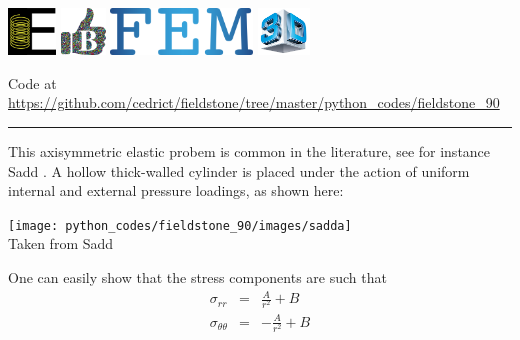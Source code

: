 \includegraphics[height=1.25cm]{images/pictograms/elasticity}
\includegraphics[height=1.25cm]{images/pictograms/benchmark}
\includegraphics[height=1.25cm]{images/pictograms/FEM}
\includegraphics[height=1.25cm]{images/pictograms/3d}




\begin{center}
Code at \url{https://github.com/cedrict/fieldstone/tree/master/python_codes/fieldstone_90}
\end{center}

\par\noindent\rule{\textwidth}{0.4pt}


This axisymmetric elastic probem is common in the literature, see for instance Sadd \cite{sadd14}.
A hollow thick-walled cylinder is placed under the
action of uniform internal and external pressure loadings, as shown here:

\begin{center}
\texttt{[image: python\_codes/fieldstone\_90/images/sadda]}\\
{\captionfont Taken from Sadd \cite{sadd14}}
\end{center}
One can easily show that the stress components are such that
\begin{eqnarray}
\sigma_{rr} &=& \frac{A}{r^2} + B \\
\sigma_{\theta\theta} &=& -\frac{A}{r^2} + B
\end{eqnarray}


